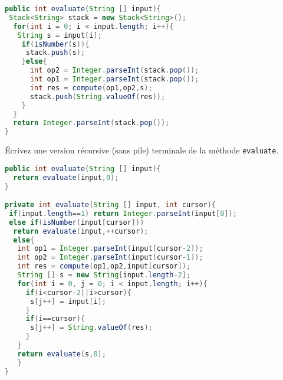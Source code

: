 \documentclass[iutinfo, a4paper, nocorrections, 10pt]{ustl-tdtp}
\begin{document}
\begin{solution}
{\color{red}
\begin{lstlisting}[language=Java]
public int evaluate(String [] input){
 Stack<String> stack = new Stack<String>();
  for(int i = 0; i < input.length; i++){
   String s = input[i];
    if(isNumber(s)){
     stack.push(s);
    }else{
      int op2 = Integer.parseInt(stack.pop());
      int op1 = Integer.parseInt(stack.pop());
      int res = compute(op1,op2,s);
      stack.push(String.valueOf(res));
    }
  }
  return Integer.parseInt(stack.pop());
}
\end{lstlisting}
}
\end{solution}

\question Écrivez une version récursive (sans pile) terminale de la méthode \texttt{evaluate}.

\begin{solution}
{\color{red}
\begin{lstlisting}[language=Java]
public int evaluate(String [] input){
  return evaluate(input,0);
}

private int evaluate(String [] input, int cursor){
 if(input.length==1) return Integer.parseInt(input[0]);
 else if(isNumber(input[cursor]))
  return evaluate(input,++cursor);
  else{ 
   int op1 = Integer.parseInt(input[cursor-2]);
   int op2 = Integer.parseInt(input[cursor-1]);
   int res = compute(op1,op2,input[cursor]);
   String [] s = new String[input.length-2];
   for(int i = 0, j = 0; i < input.length; i++){
     if(i<cursor-2||i>cursor){
	  s[j++] = input[i];
     }
     if(i==cursor){
      s[j++] = String.valueOf(res);
     }
   }
   return evaluate(s,0);
   }
}
\end{lstlisting}
}
\end{solution}
\end{document}
